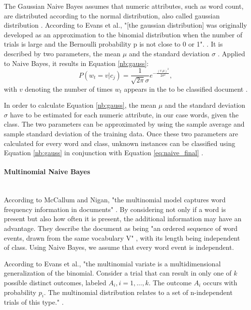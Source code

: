         The Gaussian Naive Bayes assumes that numeric attributes, such as word count, are distributed according to the normal distribution, also called gaussian distribution \cite{nb_gauss}. According to Evans et al., "[the gaussian distribution] was originally developed as an approximation to the binomial distribution when the number of trials is large and the Bernoulli probability p is not close to 0 or 1". \cite[p.~143]{evans2011statistical}. It is described by two parameters, the mean $\mu$ and the standard deviation $\sigma$ \cite{evans2011statistical}. Applied to Naive Bayes, it results in Equation \eqref{nb:gauss}:
        \begin{equation}
        \label{nb:gauss}
            P(w_t = v|c_j) = \frac{1}{\sqrt{2\pi}\sigma}e^{-\frac{(v.\mu)^2}{2\sigma^2}},
        \end{equation}
        with $v$ denoting the number of times $w_t$ appears in the to be classified document \cite{nb_gauss}.
        
        In order to calculate Equation \eqref{nb:gauss}, the mean $\mu$ and the standard deviation $\sigma$ have to be estimated for each numeric attribute, in our case words, given the class. The two parameters can be approximated by using the sample average and sample standard deviation of the training data. Once these two parameters are calculated for every word and class, unknown instances can be classified using Equation \eqref{nb:gauss} in conjunction with Equation \eqref{eq:naive_final} \cite{nb_gauss}.
        
        \paragraph{Multinomial Naive Bayes} \mbox{} \\

        According to McCallum and Nigan, "the multinomial model captures word frequency information in documents" \cite[p.~3]{Mccallum1998}. By considering not only if a word is present but also how often it is present, the additional information may have an advantage. They describe the document as being "an ordered sequence of word events, drawn from the same vocabulary V" \cite[p.~3]{Mccallum1998}, with its length being independent of class. Using Naive Bayes, we assume that every word event is independent.
        
        According to Evans et al., "the multinomial variate is a multidimensional generalization of the binomial. Consider a trial that can result in only one of $k$ possible distinct outcomes, labeled $A_i, i = 1,...,k$. The outcome $A_i$ occurs with probability $p_i$. The multinomial distribution relates to a set of n-independent trials of this type." \cite[p.~135]{evans2011statistical}.
        
